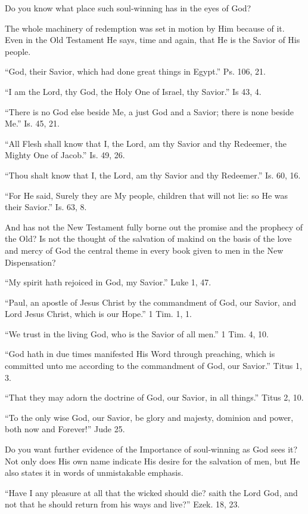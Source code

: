 \documentclass[
]{book}
\begin{document}
Do you know what place such soul-winning has in the eyes of God?

The whole machinery of redemption was set in motion by Him because of it. Even in the Old Testament He says, time and again, that He is the Savior of His people.

``God, their Savior, which had done great things in Egypt.'' Ps. 106, 21.

``I am the Lord, thy God, the Holy One of Israel, thy Savior.'' Is 43, 4.

``There is no God else beside Me, a just God and a Savior; there is none beside Me.'' Is. 45, 21.

``All Flesh shall know that I, the Lord, am thy Savior and thy Redeemer, the Mighty One of Jacob.'' Is. 49, 26.

``Thou shalt know that I, the Lord, am thy Savior and thy Redeemer.'' Is. 60, 16.

``For He said, Surely they are My people, children that will not lie: so He was their Savior.'' Is. 63, 8.

And has not the New Testament fully borne out the promise and the prophecy of the Old? Is not the thought of the salvation of makind on the basis of the love and mercy of God the central theme in every book given to men in the New Dispensation?

``My spirit hath rejoiced in God, my Savior.'' Luke 1, 47.

``Paul, an apostle of Jesus Christ by the commandment of God, our Savior, and Lord Jesus Christ, which is our Hope.'' 1 Tim. 1, 1.

``We trust in the living God, who is the Savior of all men.'' 1 Tim. 4, 10.

``God hath in due times manifested His Word through preaching, which is committed unto me according to the commandment of God, our Savior.'' Titus 1, 3.

``That they may adorn the doctrine of God, our Savior, in all things.'' Titus 2, 10.

``To the only wise God, our Savior, be glory and majesty, dominion and power, both now and Forever!'' Jude 25.

Do you want further evidence of the Importance of soul-winning as God sees it? Not only does His own name indicate His desire for the salvation of men, but He also states it in words of unmistakable emphasis.

``Have I any pleasure at all that the wicked should die? saith the Lord God, and not that he should return from his ways and live?'' Ezek. 18, 23.
\end{document}
